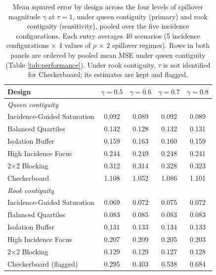 \documentclass[11pt]{article}
\begin{document}
\begin{table}[!htb]

\small
\centering

\caption{Mean squared error by design across the four levels of spillover magnitude $\gamma$ at $\tau = 1$, under queen contiguity (primary) and rook contiguity (sensitivity), pooled over the five incidence configurations. Each entry averages 40 scenarios (5 incidence configurations $\times$ 4 values of $\rho$ $\times$ 2 spillover regimes). Rows in both panels are ordered by pooled mean MSE under queen contiguity (Table \ref{tab:performance}). Under rook contiguity, $\tau$ is not identified for Checkerboard; its estimates are kept and flagged.}
\label{tab:gamma}

\begin{tabular}{lcccc}

\toprule
Design & $\gamma=0.5$ & $\gamma=0.6$ & $\gamma=0.7$ & $\gamma=0.8$ \\

\midrule
\multicolumn{5}{l}{\textit{Queen contiguity}} \\
Incidence-Guided Saturation & 0.092 & 0.089 & 0.092 & 0.089 \\
Balanced Quartiles & 0.132 & 0.128 & 0.132 & 0.131 \\
Isolation Buffer & 0.159 & 0.163 & 0.160 & 0.159 \\
High Incidence Focus & 0.244 & 0.249 & 0.248 & 0.241 \\
2$\times$2 Blocking & 0.312 & 0.314 & 0.328 & 0.323 \\
Checkerboard & 1.108 & 1.052 & 1.086 & 1.101 \\

\midrule
\multicolumn{5}{l}{\textit{Rook contiguity}} \\
Incidence-Guided Saturation & 0.069 & 0.072 & 0.075 & 0.072 \\
Balanced Quartiles & 0.083 & 0.085 & 0.083 & 0.083 \\
Isolation Buffer & 0.131 & 0.133 & 0.134 & 0.133 \\
High Incidence Focus & 0.207 & 0.209 & 0.205 & 0.203 \\
2$\times$2 Blocking & 0.129 & 0.129 & 0.127 & 0.128 \\
Checkerboard (flagged) & 0.295 & 0.403 & 0.538 & 0.684 \\

\bottomrule

\end{tabular}

\end{table}
\end{document}
